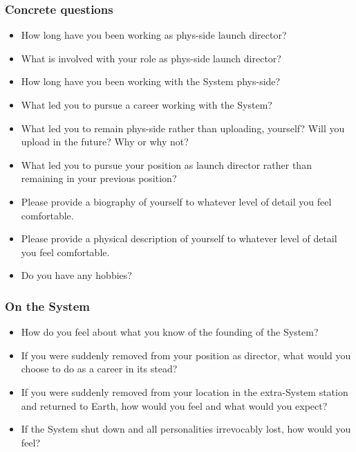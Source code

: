 \hypertarget{concrete-questions}{%
\subsubsection*{Concrete questions}\label{concrete-questions}}

\begin{itemize}
\tightlist
\item
  How long have you been working as phys-side launch director?
\item
  What is involved with your role as phys-side launch director?
\item
  How long have you been working with the System phys-side?
\item
  What led you to pursue a career working with the System?
\item
  What led you to remain phys-side rather than uploading, yourself? Will you upload in the future? Why or why not?
\item
  What led you to pursue your position as launch director rather than remaining in your previous position?
\item
  Please provide a biography of yourself to whatever level of detail you feel comfortable.
\item
  Please provide a physical description of yourself to whatever level of detail you feel comfortable.
\item
  Do you have any hobbies?
\end{itemize}

\hypertarget{on-the-system}{%
\subsubsection*{On the System}\label{on-the-system}}

\begin{itemize}
\tightlist
\item
  How do you feel about what you know of the founding of the System?
\item
  If you were suddenly removed from your position as director, what would you choose to do as a career in its stead?
\item
  If you were suddenly removed from your location in the extra-System station and returned to Earth, how would you feel and what would you expect?
\item
  If the System shut down and all personalities irrevocably lost, how would you feel?
\end{itemize}

